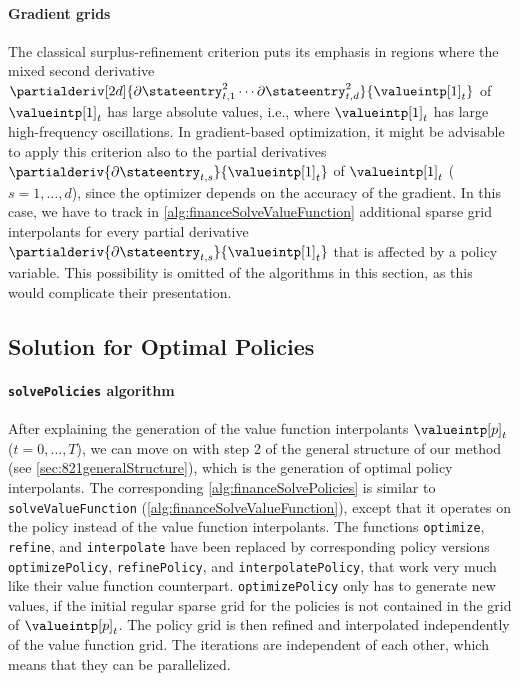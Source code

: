 \paragraph{Gradient grids}

The classical surplus-refinement criterion puts its emphasis
in regions where the mixed second derivative
$\partialderiv[2d]{
  \partialdiff \stateentry_{t,1}^2 \dotsm \partialdiff \stateentry_{t,d}^2
}{
  \valueintp[1]_t
}$
of $\valueintp[1]_t$ has large absolute values, i.e.,
where $\valueintp[1]_t$ has large high-frequency oscillations.
In gradient-based optimization,
it might be advisable to apply this criterion also
to the partial derivatives
$\partialderiv{\partialdiff \stateentry_{t,s}}{\valueintp[1]_t}$
of $\valueintp[1]_t$ ($s = 1, \dotsc, d$),
since the optimizer depends on the accuracy of the gradient.
In this case, we have to track in \cref{alg:financeSolveValueFunction}
additional sparse grid interpolants for every partial derivative
$\partialderiv{\partialdiff \stateentry_{t,s}}{\valueintp[1]_t}$
that is affected by a policy variable.
This possibility is omitted of the algorithms in this section,
as this would complicate their presentation.



\subsection{Solution for Optimal Policies}
\label{sec:827solvePolicies}

\paragraph{\texttt{solvePolicies} algorithm}

After explaining the generation of the value function interpolants
$\valueintp[p]_t$ ($t = 0, \dotsc, T$),
we can move on with step 2 of the general structure of our method
(see \cref{sec:821generalStructure}),
which is the generation of optimal policy interpolants.
The corresponding \cref{alg:financeSolvePolicies} is similar to
\texttt{solveValueFunction} (\cref{alg:financeSolveValueFunction}),
except that it operates on the policy instead of
the value function interpolants.
The functions \texttt{optimize}, \texttt{refine}, and \texttt{interpolate}
have been replaced by corresponding policy versions
\texttt{optimizePolicy}, \texttt{refinePolicy}, and \texttt{interpolatePolicy},
that work very much like their value function counterpart.
\texttt{optimizePolicy} only has to generate new values,
if the initial regular sparse grid for the policies
is not contained in the grid of $\valueintp[p]_t$.
The policy grid is then refined and interpolated independently
of the value function grid.
The iterations are independent of each other,
which means that they can be parallelized.

